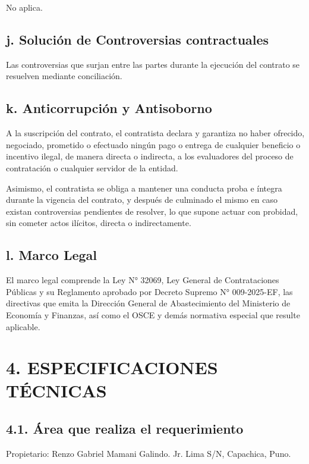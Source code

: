 \documentclass[12pt,a4paper]{article}
\begin{document}
No aplica.

\subsection*{j. Solución de Controversias contractuales}

Las controversias que surjan entre las partes durante la ejecución del contrato se resuelven mediante conciliación.

\subsection*{k. Anticorrupción y Antisoborno}

A la suscripción del contrato, el contratista declara y garantiza no haber ofrecido, negociado, prometido o efectuado ningún pago o entrega de cualquier beneficio o incentivo ilegal, de manera directa o indirecta, a los evaluadores del proceso de contratación o cualquier servidor de la entidad.

Asimismo, el contratista se obliga a mantener una conducta proba e íntegra durante la vigencia del contrato, y después de culminado el mismo en caso existan controversias pendientes de resolver, lo que supone actuar con probidad, sin cometer actos ilícitos, directa o indirectamente.

\subsection*{l. Marco Legal}

El marco legal comprende la Ley N° 32069, Ley General de Contrataciones Públicas y su Reglamento aprobado por Decreto Supremo N° 009-2025-EF, las directivas que emita la Dirección General de Abastecimiento del Ministerio de Economía y Finanzas, así como el OSCE y demás normativa especial que resulte aplicable.

\section*{4. ESPECIFICACIONES TÉCNICAS}

\subsection*{4.1. Área que realiza el requerimiento}

Propietario: Renzo Gabriel Mamani Galindo. Jr. Lima S/N, Capachica, Puno.
\end{document}
